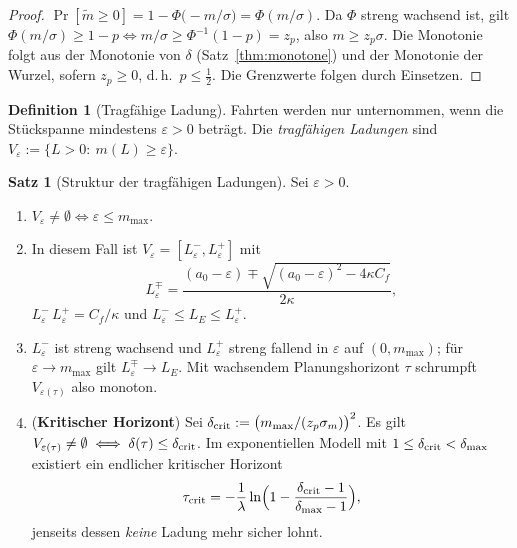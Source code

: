 \documentclass[a4paper, 12pt, twoside, openright]{report}
\theoremstyle{definition}
\newtheorem{definition}[theorem]{Definition}
\theoremstyle{definition}
\newtheorem{satz}{Satz}[chapter]
\begin{document}
\begin{proof}
$\Pr[\tilde m\ge0]=1-\Phi\bigl(-m/\sigma\bigr)=\Phi(m/\sigma)$. Da $\Phi$ streng
wachsend ist, gilt $\Phi(m/\sigma)\ge1-p\iff m/\sigma\ge\Phi^{-1}(1-p)=z_p$, also
$m\ge z_p\sigma$. Die Monotonie folgt aus der Monotonie von $\delta$
(Satz~\ref{thm:monotone}) und der Monotonie der Wurzel, sofern $z_p\ge0$, d.\,h.\
$p\le\tfrac12$. Die Grenzwerte folgen durch Einsetzen.
\end{proof}

\begin{definition}[Tragfähige Ladung]\label{def:sf-tragfaehig}
Fahrten werden nur unternommen, wenn die Stückspanne mindestens $\varepsilon>0$
beträgt. Die \emph{tragfähigen Ladungen} sind
$V_\varepsilon:=\{L>0:\ m(L)\ge\varepsilon\}$.
\end{definition}

\begin{satz}[Struktur der tragfähigen Ladungen]\label{satz:sf-V}
Sei $\varepsilon>0$.
\begin{enumerate}
  \item $V_\varepsilon\neq\emptyset\iff\varepsilon\le m_{\max}$.
  \item In diesem Fall ist $V_\varepsilon=[L_\varepsilon^-,L_\varepsilon^+]$ mit
    \begin{equation}
      L_\varepsilon^{\mp}=\frac{(a_0-\varepsilon)\mp\sqrt{(a_0-\varepsilon)^2-4\kappa C_f}}{2\kappa},
      \label{eq:sf-Leps}
    \end{equation}
    $L_\varepsilon^-\,L_\varepsilon^+=C_f/\kappa$ und $L_\varepsilon^-\le L_E\le L_\varepsilon^+$.
  \item $L_\varepsilon^-$ ist streng wachsend und $L_\varepsilon^+$ streng fallend in
    $\varepsilon$ auf $(0,m_{\max})$; für $\varepsilon\to m_{\max}$ gilt
    $L_\varepsilon^\mp\to L_E$. Mit wachsendem Planungshorizont $\tau$ schrumpft
    $V_{\varepsilon(\tau)}$ also monoton.
  \item (\textbf{Kritischer Horizont}) Sei $\delta_{\rm crit}:=\bigl(m_{\max}/(z_p\sigma_m)\bigr)^2$.
    Es gilt $V_{\varepsilon(\tau)}\ne\emptyset\iff\delta(\tau)\le\delta_{\rm crit}$.
    Im exponentiellen Modell mit $1\le\delta_{\rm crit}<\delta_{\max}$ existiert ein
    endlicher kritischer Horizont
    \begin{equation}
      \tau_{\rm crit}=-\frac1\lambda\ln\Bigl(1-\frac{\delta_{\rm crit}-1}{\delta_{\max}-1}\Bigr),
      \label{eq:sf-taucrit}
    \end{equation}
    jenseits dessen \emph{keine} Ladung mehr sicher lohnt.
\end{enumerate}
\end{satz}
\end{document}
